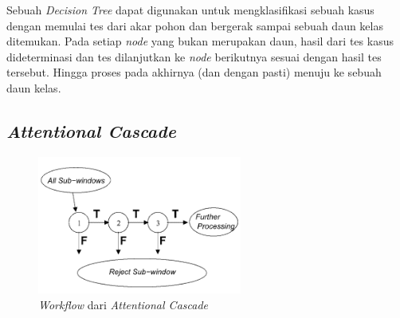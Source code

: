 Sebuah \emph{Decision Tree} dapat digunakan untuk mengklasifikasi sebuah kasus 
dengan memulai tes dari akar pohon dan bergerak sampai sebuah daun kelas ditemukan. 
Pada setiap \emph{node} yang bukan merupakan daun, hasil dari tes kasus 
dideterminasi dan tes dilanjutkan ke \emph{node} berikutnya sesuai dengan 
hasil tes tersebut. Hingga proses pada akhirnya (dan dengan pasti) 
menuju ke sebuah daun kelas.



\subsection{\emph{Attentional Cascade}}

\begin{figure}[H]
  \centering{}
	\includegraphics[width=0.6\textwidth]{gambar/cascade}
  \caption{\textit{Workflow} dari \emph{Attentional Cascade}}
\end{figure}

